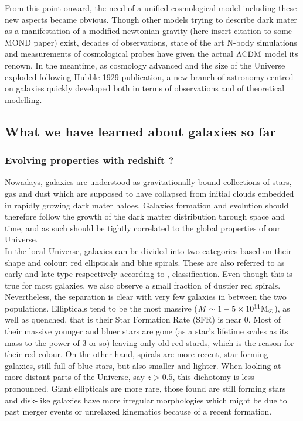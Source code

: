 From this point onward, the need of a unified cosmological model including these new aspects became obvious. Though other models trying to describe dark mater as a manifestation of a modified newtonian gravity (here insert citation to some MOND paper) exist, decades of observations, state of the art N-body simulations and measurements of cosmological probes have given the actual $\Lambda \rm{CDM}$ model its renown. In the meantime, as cosmology advanced and the size of the Universe exploded following Hubble 1929 publication, a new branch of astronomy centred on galaxies quickly developed both in terms of observations and of theoretical modelling.

\subsection{What we have learned about galaxies so far}

\subsubsection{Evolving properties with redshift ?}

Nowadays, galaxies are understood as gravitationally bound collections of stars, gas and dust which are supposed to have collapsed from initial clouds embedded in rapidly growing dark mater haloes. Galaxies formation and evolution should therefore follow the growth of the dark matter distribution through space and time, and as such should be tightly correlated to the global properties of our Universe. \\

In the local Universe, galaxies can be divided into two categories based on their shape and colour: red ellipticals and blue spirals. These are also referred to as early and late type respectively according to ,   classification. Even though this is true for most galaxies, we also observe a small fraction of dustier red spirals. Nevertheless, the separation is clear with very few galaxies in between the two populations. Ellipticals tend to be the most massive ($M \sim 1-5 \times 10^{11} \rm{M_\odot}$), as well as quenched, that is their Star Formation Rate (SFR) is near $0$. Most of their massive younger and bluer stars are gone (as a star's lifetime scales as its mass to the power of 3 or so) leaving only old red stards, which is the reason for their red colour. On the other hand, spirals are more recent, star-forming galaxies, still full of blue stars, but also smaller and lighter.
When looking at more distant parts of the Universe, say $z > 0.5$, this dichotomy is less pronounced. Giant ellipticals are more rare, those found are still forming stars and disk-like galaxies have more irregular morphologies which might be due to past merger events or unrelaxed kinematics because of a recent formation.\\

